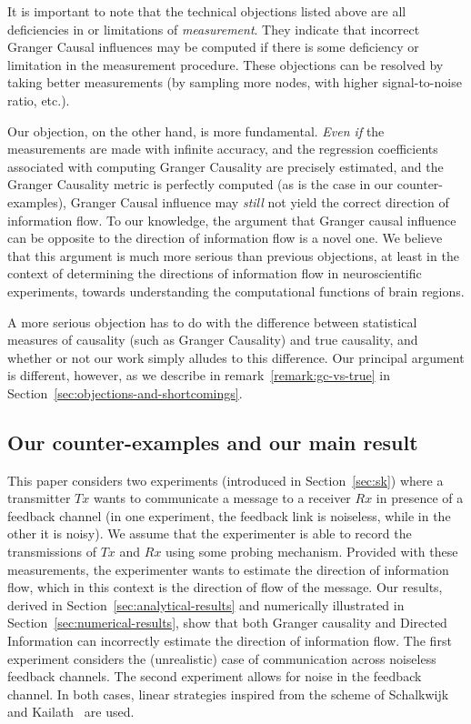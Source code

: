 \documentclass[letterpaper, 10pt, conference]{ieeeconf}
\begin{document}
It is important to note that the technical objections listed above are all deficiencies in or limitations of \emph{measurement}. They indicate that incorrect Granger Causal influences may be computed if there is some deficiency or limitation in the measurement procedure. These objections can be resolved by taking better measurements (by sampling more nodes, with higher signal-to-noise ratio, etc.).

Our objection, on the other hand, is more fundamental. \emph{Even if} the measurements are made with infinite accuracy, and the regression coefficients associated with computing Granger Causality are precisely estimated, and the Granger Causality metric is perfectly computed (as is the case in our counter-examples), Granger Causal influence may \emph{still} not yield the correct direction of information flow. To our knowledge, the argument that Granger causal influence can be opposite to the direction of information flow is a novel one. We believe that this argument is much more serious than previous objections, at least in the context of determining the directions of information flow in neuroscientific experiments, towards understanding the computational functions of brain regions.

A more serious objection has to do with the difference between statistical measures of causality (such as Granger Causality) and true causality, and whether or not our work simply alludes to this difference. Our principal argument is different, however, as we describe in remark~\ref{remark:gc-vs-true} in Section~\ref{sec:objections-and-shortcomings}.


\subsection{Our counter-examples and our main result}
\label{sec:our-counterexamples}

This paper considers two experiments (introduced in Section~\ref{sec:sk}) where a transmitter $Tx$ wants to communicate a message to a receiver $Rx$ in presence of a feedback channel (in one experiment, the feedback link is noiseless, while in the other it is noisy). We assume that the experimenter is able to record the transmissions of $Tx$ and $Rx$ using some probing mechanism. Provided with these measurements, the experimenter wants to estimate the direction of information flow, which in this context is the direction of flow of the message. Our results, derived in Section~\ref{sec:analytical-results} and numerically illustrated in Section~\ref{sec:numerical-results}, show that both Granger causality and Directed Information can incorrectly estimate the direction of information flow. The first experiment considers the (unrealistic) case of communication across noiseless feedback channels. The second experiment allows for noise in the feedback channel. In both cases, linear strategies inspired from the scheme of Schalkwijk and Kailath~\cite{S&K} are used.
\end{document}
